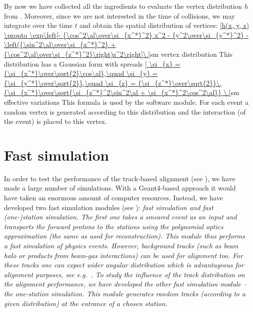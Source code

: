 By now we have collected all the ingredients to evaluate the vertex distribution $h$ from . Moreover, since we are not interested in the time of collisions, we may integrate over the time $t$ and obtain the spatial distribution of vertices:
\eqref{h(x, y, z) \propto \exp\left[- {\cos^2\al\over\si_{x^*}^2} x^2 - {y^2\over\si_{y^*}^2} - \left({\sin^2\al\over\si_{x^*}^2} + {\cos^2\al\over\si_{z^*}^2}\right)z^2\right]\.}{sm vertex distribution}
This distribution has a Gaussian form with spreads
\eqref{
	\si_{x} = {\si_{x^*}\over\sqrt{2}\cos\al},\quad
	\si_{y} = {\si_{y^*}\over\sqrt{2}},\quad
	\si_{z} = {\si_{z^*}\over\sqrt{2}}\,{\si_{x^*}\over\sqrt{\si_{z^*}^2\sin^2\al + \si_{x^*}^2\cos^2\al}} \.}{sm effective variations}
This formula is used by the software module. For each event a random vertex is generated according to this distribution and the interaction (of the event) is placed to this vertex.


\section[fast simu]{Fast simulation}

In order to test the performance of the track-based alignment (see ), we have made a large number of  simulations. With a Geant4-based approach it would have taken an enormous amount of computer resources. Instead, we have developed two fast simulation modules (see ): \em{fast simulation} and \em{fast (one-)station simulation}. The first one takes a smeared event as an input and transports the forward protons to the  stations using the polynomial optics approximation (the same as used for reconstruction). This module thus performs a fast simulation of physics events. However, background tracks (such as beam halo or products from beam-gas interactions) can be used for alignment too. For these tracks one can expect wider angular distribution which is advantageous for alignment purposes, see e.g.~. To study the influence of the track distribution on the alignment performance, we have developed the other fast simulation module -- the one-station simulation. This module generates random tracks (according to a given distribution) at the entrance of a chosen station.

